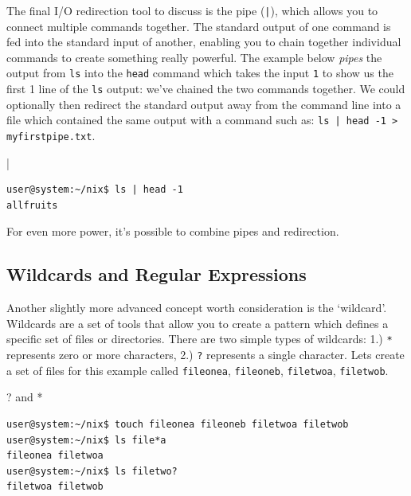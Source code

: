 \documentclass[11pt]{article}
\begin{document}
The final I/O redirection tool to discuss is the pipe (\texttt{|}), which allows you to connect multiple commands together. The standard output of one command is fed into the standard input of another, enabling you to chain together individual commands to create something really powerful. The example below \emph{pipes} the output from \texttt{ls} into the \texttt{head} command which takes the input \texttt{1} to show us the first 1 line of the \texttt{ls} output: we've chained the two commands together. We could optionally then redirect the standard output away from the command line into a file which contained the same output with a command such as: \texttt{ls | head -1 > myfirstpipe.txt}.\\

\begin{listing}[H]
\caption{|}\vspace{-0.1in}
\begin{verbatim}
user@system:~/nix$ ls | head -1
allfruits
\end{verbatim}
\end{listing}

For even more power, it's possible to combine pipes and redirection.
\subsection{Wildcards and Regular Expressions}

Another slightly more advanced concept worth consideration is the `wildcard'.  Wildcards are a set of tools that allow you to create a pattern which defines a specific set of files or directories. There are two simple types of wildcards: 1.) \texttt{*} represents zero or more characters, 2.) \texttt{?} represents a single character. Lets create a set of files for this example called \texttt{fileonea}, \texttt{fileoneb}, \texttt{filetwoa}, \texttt{filetwob}.\\

\begin{listing}[H]
\caption{? and *}\vspace{-0.1in}
\begin{verbatim}
user@system:~/nix$ touch fileonea fileoneb filetwoa filetwob
user@system:~/nix$ ls file*a
fileonea filetwoa
user@system:~/nix$ ls filetwo?
filetwoa filetwob
\end{verbatim}
\end{listing}
\end{document}
